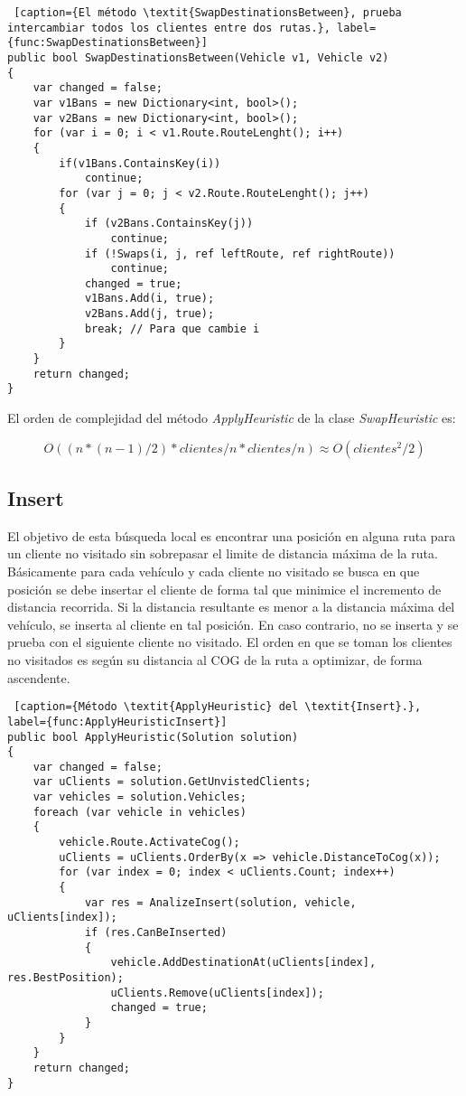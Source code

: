 \begin{minipage}{\textwidth}
\begin{lstlisting} [caption={El método \textit{SwapDestinationsBetween}, prueba intercambiar todos los clientes entre dos rutas.}, label={func:SwapDestinationsBetween}]
public bool SwapDestinationsBetween(Vehicle v1, Vehicle v2)
{
	var changed = false;
	var v1Bans = new Dictionary<int, bool>();
	var v2Bans = new Dictionary<int, bool>();
	for (var i = 0; i < v1.Route.RouteLenght(); i++)
	{
		if(v1Bans.ContainsKey(i)) 
			continue;
		for (var j = 0; j < v2.Route.RouteLenght(); j++)
		{
			if (v2Bans.ContainsKey(j)) 
				continue;
			if (!Swaps(i, j, ref leftRoute, ref rightRoute)) 
				continue;
			changed = true;
			v1Bans.Add(i, true);
			v2Bans.Add(j, true);
			break; // Para que cambie i
		}
	}
	return changed;
}
\end{lstlisting}
\end{minipage}

\bigskip

El orden de complejidad del método \textit{ApplyHeuristic} de la clase \textit{SwapHeuristic} es:

\begin{equation*}
O((n * (n-1) / 2 ) * clientes/n * clientes/n) \approx O(clientes^2/2)
\end{equation*}

\subsection{Insert}

El objetivo de esta búsqueda local es encontrar una posición en alguna ruta para un cliente no visitado sin sobrepasar el limite de distancia máxima de la ruta. Básicamente para cada vehículo y cada cliente no visitado se busca en que posición se debe insertar el cliente de forma tal que minimice el incremento de distancia recorrida. Si la distancia resultante es menor a la distancia máxima del vehículo, se inserta al cliente en tal posición. En caso contrario, no se inserta y se prueba con el siguiente cliente no visitado. El orden en que se toman los clientes no visitados es según su distancia al COG de la ruta a optimizar, de forma ascendente.

\begin{minipage}{\textwidth}
\begin{lstlisting} [caption={Método \textit{ApplyHeuristic} del \textit{Insert}.}, label={func:ApplyHeuristicInsert}]
public bool ApplyHeuristic(Solution solution)
{
	var changed = false;	
	var uClients = solution.GetUnvistedClients;	
	var vehicles = solution.Vehicles;
	foreach (var vehicle in vehicles)
	{
		vehicle.Route.ActivateCog();
		uClients = uClients.OrderBy(x => vehicle.DistanceToCog(x));	
		for (var index = 0; index < uClients.Count; index++)
		{
			var res = AnalizeInsert(solution, vehicle, uClients[index]);
			if (res.CanBeInserted)
			{
				vehicle.AddDestinationAt(uClients[index], res.BestPosition);
				uClients.Remove(uClients[index]);
				changed = true;
			}
		}
	}
	return changed;
}
\end{lstlisting}
\end{minipage}

